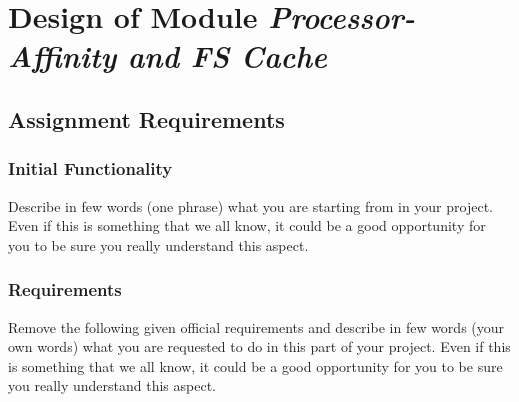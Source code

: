 
\chapter{Design of Module \textit{Processor-Affinity and FS Cache}}


\section{Assignment Requirements}

\subsection{Initial Functionality}

Describe in few words (one phrase) what you are starting from in your project. Even if this is something that we all know, it could be a good opportunity for you to be sure you really understand this aspect.

\subsection{Requirements}

Remove the following given official requirements and describe in few words (your own words) what you are requested to do in this part of your project. Even if this is something that we all know, it could be a good opportunity for you to be sure you really understand this aspect. 

